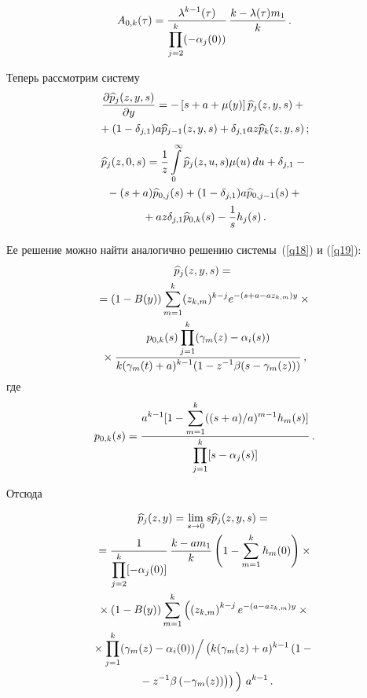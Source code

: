 \begin{multicols}{2}
\noindent
\begin{equation*}
A_{0,k}(\tau)=\displaystyle\frac{\displaystyle \lambda^{k-1}(\tau)\mathstrut}{\displaystyle \prod\limits_{j=2}^{k}(-\alpha_{j}(0))\mathstrut}\,\displaystyle\frac{\displaystyle k-\lambda(\tau)m_{1}\mathstrut}{\displaystyle k\mathstrut}\,.
\end{equation*}

Теперь рассмотрим систему
\begin{multline*}
\displaystyle\frac{\displaystyle \partial \widehat{p}_{j}(z,y,s)\mathstrut}{\displaystyle \partial y\mathstrut}
=-\left[s+a+\mu(y)\right]\widehat{p}_{j}(z,y,s)
+{}\\
{}+(1-\delta_{j,1})a\widehat{p}_{j-1}(z,y,s) +
\delta_{j,1}az\widehat{p}_{k}(z,y,s)\,;
\end{multline*}
%
%
\begin{multline*}
\widehat{p}_{j}(z,0,s)=\displaystyle\frac{\displaystyle 1\mathstrut}{\displaystyle z\mathstrut}\int\limits_{0}^{\infty}\widehat{p}_{j}(z,u,s)\mu(u)\,du+\delta_{j,1}-{}\\
{}-
(s+a)\widehat{p}_{0,j}(s)+ (1-\delta_{j,1})a\widehat{p}_{0,j-1}(s)+{}\\
{}+
az\delta_{j,1}\widehat{p}_{0,k}(s)-\displaystyle\frac{\displaystyle 1\mathstrut}{\displaystyle s\mathstrut}h_{j}(s)\,.
\end{multline*}

Ее решение можно найти аналогично  решению системы~(\ref{q18}) и (\ref{q19}):
\begin{multline*}
\widehat{p}_{j}(z,y,s)={}\\
{}=(1-B(y))\sum_{m=1}^{k}(z_{k,m})^{k-j}
e^{-(s+a-az_{k,m})y}\times{}\\ 
{}\times\displaystyle\frac{\displaystyle p_{0,k}(s)\prod\limits_{j=1}^{k}(\gamma_{m}(z)-\alpha_{i}(s))\mathstrut}{\displaystyle k(\gamma_{m}(t)+a)^{k-1}(1-z^{-1}\beta(s-\gamma_{m}(z)))\mathstrut}\,,
\end{multline*}
где
$$
p_{0,k}(s)=\displaystyle\frac{\displaystyle a^{k-1}[1-\sum\limits_{m=1}^{k}((s+a)/a)^{m-1}h_{m}(s)]\mathstrut}{\displaystyle \prod\limits_{j=1}^{k}[s-\alpha_{j}(s)]
\mathstrut}\,.
$$

Отсюда

\noindent
\begin{multline}
\widehat{p}_{j}(z,y)=\lim\limits_{s\rightarrow 0}s\widehat{p}_{j}(z,y,s)={}\\
{}=
\fr{1}{\prod\limits_{j=2}^{k}[-\alpha_{j}(0)]}\,\fr{k-am_{1}}{k}\left(1-\sum\limits_{m=1}^{k}h_{m}(0)\right)
\times{}\\
{}\times \left (1-B(y)\right )
\sum_{m=1}^{k}\left (\left(z_{k,m}\right)^{k-j}
e^{-(a-az_{k,m})y}\times{}\right.\\
{}\times\prod\limits_{j=1}^{k}(\gamma_{m}(z)-\alpha_{i}(0))\Big /
\left ( k(\gamma_{m}(z)+a)^{k-1}\left (1-{}\right.\right.\\
\left.\left.\left.   {}-z^{-1}
\beta\left(-\gamma_{m}(z)\right)\right )\right )
\vphantom{\left(z_{k,m}\right)^{k-j}}
\right )\, a^{k-1}\,.
\label{e44}
\end{multline}



\end{multicols}
